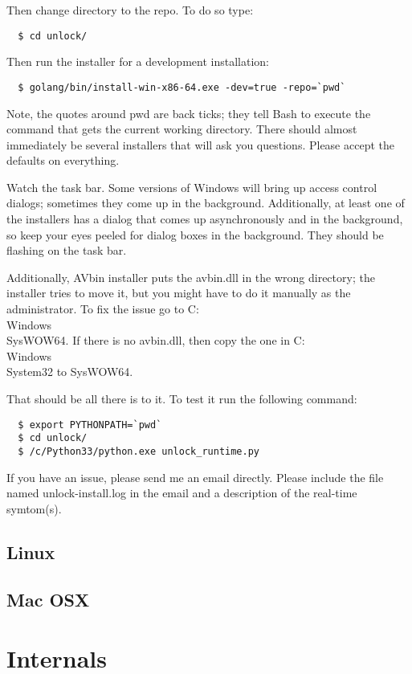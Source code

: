\documentclass[11pt]{article}
\begin{document}
Then change directory to the repo.  To do so type:
\begin{verbatim}
  $ cd unlock/
\end{verbatim}

Then run the installer for a development installation:
\begin{verbatim}
  $ golang/bin/install-win-x86-64.exe -dev=true -repo=`pwd`
\end{verbatim}

Note, the quotes around pwd are back ticks; they tell Bash to execute the command that gets the current working directory.  There should almost immediately be several installers that will ask you questions.  Please accept the defaults on everything.  

Watch the task bar.  Some versions of Windows will bring up access control dialogs; sometimes they come up in the background.  Additionally, at least one of the installers has a dialog that comes up asynchronously and in the background, so keep your eyes peeled for dialog boxes in the background.  They should be flashing on the task bar.

Additionally, AVbin installer puts the avbin.dll in the wrong directory; the installer tries to move it, but you might have to do it manually as the administrator. To fix the issue go to C:\\Windows\\SysWOW64. If there is no avbin.dll, then copy the one in C:\\Windows\\System32 to SysWOW64.

That should be all there is to it.  To test it run the following command:

\begin{verbatim}
  $ export PYTHONPATH=`pwd`
  $ cd unlock/
  $ /c/Python33/python.exe unlock_runtime.py
\end{verbatim} 

If you have an issue, please send me an email directly.  Please include the file named unlock-install.log in the email and a description of the real-time symtom(s).  
 
\subsection{Linux}
\subsection{Mac OSX}
\section{Internals}
\end{document}
